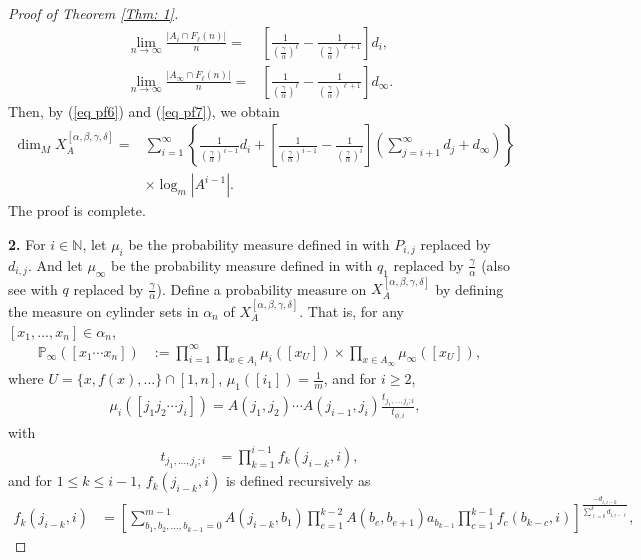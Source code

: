 \documentclass{amsart}
\theoremstyle{definition}
\numberwithin{equation}{section}%
\begin{document}
\begin{proof}[Proof of Theorem \ref{Thm: 1}]
\begin{equation}
\begin{aligned}
        \lim_{n\to\infty}\frac{\left| A_i\cap F_\ell(n)\right|}{n}=&\left[\frac{1}{(\frac{\gamma}{\alpha})^{\ell}}-\frac{1}{(\frac{\gamma}{\alpha})^{\ell+1}}\right]d_i,\\
        \lim_{n\to\infty}\frac{\left|A_\infty\cap F_\ell(n)\right|}{n}=&\left[\frac{1}{(\frac{\gamma}{\alpha})^{\ell}}-\frac{1}{(\frac{\gamma}{\alpha})^{\ell+1}}\right]d_\infty.
    \end{aligned}
\end{equation}
Then, by (\ref{eq pf6}) and (\ref{eq pf7}), we obtain 
   \begin{align*}
    \dim_M X^{[\alpha,\beta,\gamma,\delta]}_A =&\sum_{i=1}^\infty\left\{\frac{1}{(\frac{\gamma}{\alpha})^{i-1}}d_i+\left[\frac{1}{(\frac{\gamma}{\alpha})^{i-1}}-\frac{1}{(\frac{\gamma}{\alpha})^{i}}\right]\left(\sum_{j=i+1}^\infty d_j+d_{\infty}\right)\right\}\\
    &\times \log_m|A^{i-1}|.
    \end{align*}
    The proof is complete.
\item[\bf 2.]
For $i\in\mathbb{N}$, let $\mu_i$ be the probability measure defined in \cite[Theorem 1.3 (2)]{ban2024hausdorffaffine} with $P_{i,j}$ replaced by $d_{i,j}$. And let $\mu_\infty$ be the probability measure defined in \cite[Theorem 1.3 (2)]{ban2024hausdorffaffine} with $q_1$ replaced by $\frac{\gamma}{\alpha}$ (also see \cite[Corollary 2.6]{kenyon2012hausdorff} with $q$ replaced by $\frac{\gamma}{\alpha}$). Define a probability measure on $X^{[\alpha,\beta,\gamma,\delta]}_A$ by defining the measure on cylinder sets in $\alpha_n$ of $X^{[\alpha,\beta,\gamma,\delta]}_A$. That is, for any $[x_1,...,x_n]\in \alpha_n$,
    \begin{align*}
        \mathbb{P}_{\infty}([x_1\cdots x_n])&:=\prod_{i=1}^\infty\prod_{x\in A_i}\mu_i([x_{U}])\times \prod_{x\in A_\infty} \mu_\infty ([x_U]),
    \end{align*}
where $U=\{x, f(x), ...\}\cap [1, n]$, $\mu_1([i_1])=\frac{1}{m}$, and for $i\geq 2$,
\begin{align*}
    &\mu_{i}([j_1j_2\cdots j_i])=A(j_1,j_2)\cdots A(j_{i-1},j_i)\frac{t_{j_1,...,j_i;i}}{t_{\phi;i}},
\end{align*}
with
\begin{align*}
    t_{j_1,...,j_i;i}&=\prod_{k=1}^{i-1}f_k(j_{i-k},i),
\end{align*}
and for $1\leq k \leq i-1$, $f_{k}(j_{i-k},i)$ is defined recursively as
\begin{align*}
f_k(j_{i-k},i)&=\left[\sum_{b_1,b_2,...,b_{k-1}=0}^{m-1}A(j_{i-k},b_1)\prod_{e=1}^{k-2}A(b_e,b_{e+1})a_{b_{k-1}}\prod_{c=1}^{k-1}f_{c}(b_{k-c},i)\right]^{\frac{-d_{i,i-k}}{\sum_{\ell=0}^k d_{i,i-\ell}}},

\end{align*}
\end{proof}
\end{document}
